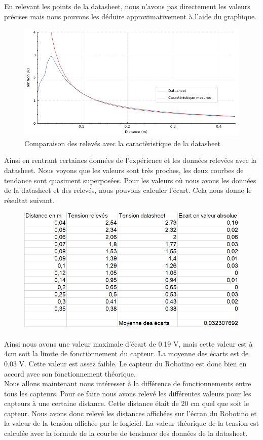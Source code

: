 \documentclass[oneside,a4paper,12pt]{article}
\begin{document}
	En relevant les points de la datasheet, nous n’avons pas directement les valeurs précises mais nous pouvons les déduire approximativement à l’aide du graphique.
	
	
	\begin{figure}[h]
		\centering
		\includegraphics[width=12cm]{Comparedatasheet_mesures_v-d2.png}
		\caption{Comparaison des relevés avec la caractèristique de la datasheet}
	\end{figure}
	
	Ainsi en rentrant certaines données de l’expérience et les données relevées avec la datasheet. Nous voyons que les valeurs sont très proches, les deux courbes de tendance sont quasiment superposées.
	Pour les valeurs où nous avons les données de la datasheet et des relevés, nous pouvons calculer l’écart. Cela nous donne le résultat suivant.
	
	\begin{figure}[h]
		\centering
		\includegraphics[width=12cm]{tab1.png}
	\end{figure}

	\paragraph{}
	Ainsi nous avons une valeur maximale d’écart de 0.19 V, mais cette valeur est à 4cm soit la limite de fonctionnement du capteur. La moyenne des écarts est de 0.03 V. Cette valeur est assez faible. Le capteur du Robotino est donc bien en accord avec son fonctionnement théorique.\\
	Nous allons maintenant nous intéresser à la différence de fonctionnements entre tous les capteurs. Pour ce faire nous avons relevé les différentes valeurs pour les capteurs à une certaine distance. Cette distance était de 20 cm quel que soit le capteur. Nous avons donc relevé les distances affichées sur l’écran du Robotino et la valeur de la tension affichée par le logiciel. La valeur théorique de la tension est calculée avec la formule de la courbe de tendance des données de la datasheet.
	
\end{document}
